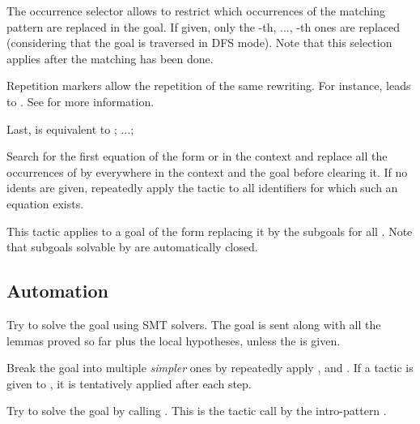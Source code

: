   \smallskip
  
  The occurrence selector  allows to restrict which occurrences
  of the matching pattern are replaced in the goal. If given, only the
  -th, ..., -th ones are replaced (considering that the goal is
  traversed in DFS mode). Note that this selection applies after the matching has
  been done.
  
  \medskip
  
  Repetition markers allow the repetition of the same rewriting. For instance,
  \tacname{}  leads to  \tacname{} . See  for
  more information.
  
  \medskip

  Last, \tacname{}  is equivalent to
  \tacname{} ; ...; \tacname{} 
  
Search for the first equation of the form  or  in the context
 and replace all the occurrences of  by  everywhere in the context and the
 goal before clearing it. If no idents are given, repeatedly apply the tactic to
 all identifiers for which such an equation exists.

This tactic applies to a goal of the form 
 replacing it by  the subgoals  for all . Note that subgoals
 solvable by  are automatically closed.


\subsection{Automation}

Try to solve the goal using SMT solvers. The goal is sent along with all the
 lemmas proved so far plus the local hypotheses, unless the  is
 given.
 
 \noindent\begin{center}
 \end{center}

Break the goal into multiple \emph{simpler} ones by repeatedly apply
,  and . If a tactic is given to \tacname{},
it is tentatively applied after each step.

Try to solve the goal by calling .
This is the tactic call by the intro-pattern \ec{//}.
